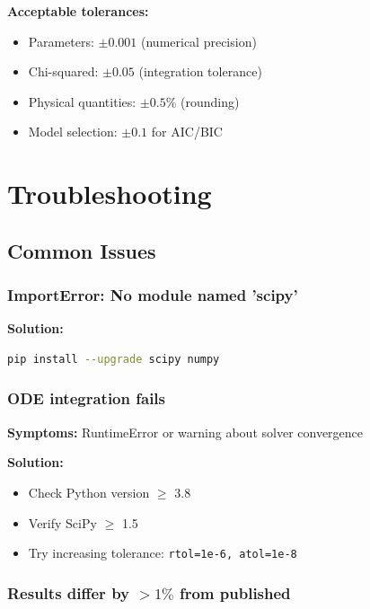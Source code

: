 \documentclass[11pt]{article}
\begin{document}
\noindent\textbf{Acceptable tolerances:}
\begin{itemize}
    \item Parameters: $\pm 0.001$ (numerical precision)
    \item Chi-squared: $\pm 0.05$ (integration tolerance)
    \item Physical quantities: $\pm 0.5\%$ (rounding)
    \item Model selection: $\pm 0.1$ for AIC/BIC
\end{itemize}

\section{Troubleshooting}

\subsection{Common Issues}

\subsubsection{ImportError: No module named 'scipy'}

\textbf{Solution:}
\begin{lstlisting}[language=bash]
pip install --upgrade scipy numpy
\end{lstlisting}

\subsubsection{ODE integration fails}

\textbf{Symptoms:} RuntimeError or warning about solver convergence

\textbf{Solution:}
\begin{itemize}
    \item Check Python version $\geq$ 3.8
    \item Verify SciPy $\geq$ 1.5
    \item Try increasing tolerance: \texttt{rtol=1e-6, atol=1e-8}
\end{itemize}

\subsubsection{Results differ by $>1\%$ from published}
\end{document}
